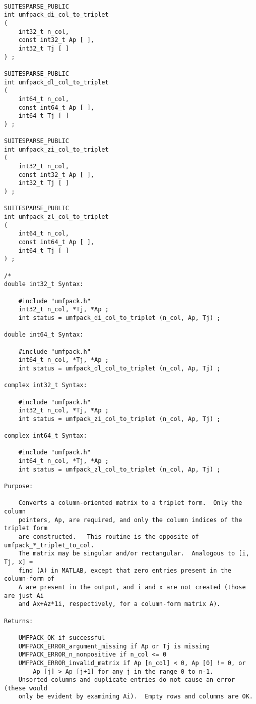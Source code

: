 \documentclass[11pt]{article}
\begin{document}
{\footnotesize
\begin{verbatim}

SUITESPARSE_PUBLIC
int umfpack_di_col_to_triplet
(
    int32_t n_col,
    const int32_t Ap [ ],
    int32_t Tj [ ]
) ;

SUITESPARSE_PUBLIC
int umfpack_dl_col_to_triplet
(
    int64_t n_col,
    const int64_t Ap [ ],
    int64_t Tj [ ]
) ;

SUITESPARSE_PUBLIC
int umfpack_zi_col_to_triplet
(
    int32_t n_col,
    const int32_t Ap [ ],
    int32_t Tj [ ]
) ;

SUITESPARSE_PUBLIC
int umfpack_zl_col_to_triplet
(
    int64_t n_col,
    const int64_t Ap [ ],
    int64_t Tj [ ]
) ;

/*
double int32_t Syntax:

    #include "umfpack.h"
    int32_t n_col, *Tj, *Ap ;
    int status = umfpack_di_col_to_triplet (n_col, Ap, Tj) ;

double int64_t Syntax:

    #include "umfpack.h"
    int64_t n_col, *Tj, *Ap ;
    int status = umfpack_dl_col_to_triplet (n_col, Ap, Tj) ;

complex int32_t Syntax:

    #include "umfpack.h"
    int32_t n_col, *Tj, *Ap ;
    int status = umfpack_zi_col_to_triplet (n_col, Ap, Tj) ;

complex int64_t Syntax:

    #include "umfpack.h"
    int64_t n_col, *Tj, *Ap ;
    int status = umfpack_zl_col_to_triplet (n_col, Ap, Tj) ;

Purpose:

    Converts a column-oriented matrix to a triplet form.  Only the column
    pointers, Ap, are required, and only the column indices of the triplet form
    are constructed.   This routine is the opposite of umfpack_*_triplet_to_col.
    The matrix may be singular and/or rectangular.  Analogous to [i, Tj, x] =
    find (A) in MATLAB, except that zero entries present in the column-form of
    A are present in the output, and i and x are not created (those are just Ai
    and Ax+Az*1i, respectively, for a column-form matrix A).

Returns:

    UMFPACK_OK if successful
    UMFPACK_ERROR_argument_missing if Ap or Tj is missing
    UMFPACK_ERROR_n_nonpositive if n_col <= 0
    UMFPACK_ERROR_invalid_matrix if Ap [n_col] < 0, Ap [0] != 0, or
        Ap [j] > Ap [j+1] for any j in the range 0 to n-1.
    Unsorted columns and duplicate entries do not cause an error (these would
    only be evident by examining Ai).  Empty rows and columns are OK.


\end{verbatim}}
\end{document}
